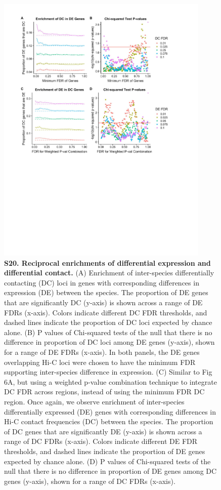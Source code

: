 \begin{figure}[!htb]
\centering
\includegraphics[width=4in]{img/figS20.pdf}
\caption[Reciprocal enrichments of differential expression and differential contact.]{\textbf{S20. Reciprocal enrichments of differential expression and differential contact.} (A) Enrichment of inter-species differentially contacting (DC) loci in genes with corresponding differences in expression (DE) between the species. The proportion of DE genes that are significantly DC (y-axis) is shown across a range of DE FDRs (x-axis). Colors indicate different DC FDR thresholds, and dashed lines indicate the proportion of DC loci expected by chance alone. (B) P values of Chi-squared tests of the null that there is no difference in proportion of DC loci among DE genes (y-axis), shown for a range of DE FDRs (x-axis). In both panels, the DE genes overlapping Hi-C loci were chosen to have the minimum FDR supporting inter-species difference in expression. (C) Similar to Fig 6A, but using a weighted p-value combination technique \cite{Whitlock.2005} to integrate DC FDR across regions, instead of using the minimum FDR DC region. Once again, we observe enrichment of inter-species differentially expressed (DE) genes with corresponding differences in Hi-C contact frequencies (DC) between the species. The proportion of DC genes that are significantly DE (y-axis) is shown across a range of DC FDRs (x-axis). Colors indicate different DE FDR thresholds, and dashed lines indicate the proportion of DE genes expected by chance alone. (D) P values of Chi-squared tests of the null that there is no difference in proportion of DE genes among DC genes (y-axis), shown for a range of DC FDRs (x-axis).}
\label{fig:ch02-figS20}
\end{figure}


